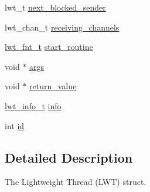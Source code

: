 \begin{DoxyCompactItemize}
\item 
lwt\+\_\+t \hyperlink{structlwt_a3998a6f0e9400a8cd5534b76a9bdb843}{next\+\_\+blocked\+\_\+sender}
\item 
lwt\+\_\+chan\+\_\+t \hyperlink{structlwt_ac857ca0e804faec3a2dc17ff1ee0f22d}{receiving\+\_\+channels}
\item 
\hyperlink{lwt_8h_a58d5112b6c76cbcd033e124f6131a51a}{lwt\+\_\+fnt\+\_\+t} \hyperlink{structlwt_acdcfc344e943154b9d3d11e1a41cb9f1}{start\+\_\+routine}
\item 
void $\ast$ \hyperlink{structlwt_a6e870b21b996bc5c62b6cbd04328e784}{args}
\item 
void $\ast$ \hyperlink{structlwt_a22ac5beef8503481294035218e73c3ef}{return\+\_\+value}
\item 
\hyperlink{lwt_8h_a1148b40d53237025b24f0b603b387e75}{lwt\+\_\+info\+\_\+t} \hyperlink{structlwt_a40641e751624b983f5e1ae5302210e5d}{info}
\item 
int \hyperlink{structlwt_aa3df3d76d606756e38bb9bd3d2c2d241}{id}
\end{DoxyCompactItemize}


\subsection{Detailed Description}
The Lightweight Thread (L\+W\+T) struct. 

